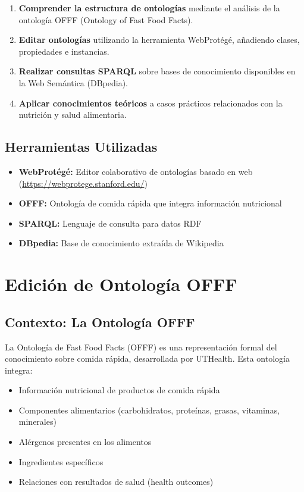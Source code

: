 \documentclass[12pt,a4paper]{article}
\begin{document}
\begin{enumerate}
    \item \textbf{Comprender la estructura de ontologías} mediante el análisis de la ontología OFFF (Ontology of Fast Food Facts).
    \item \textbf{Editar ontologías} utilizando la herramienta WebProtégé, añadiendo clases, propiedades e instancias.
    \item \textbf{Realizar consultas SPARQL} sobre bases de conocimiento disponibles en la Web Semántica (DBpedia).
    \item \textbf{Aplicar conocimientos teóricos} a casos prácticos relacionados con la nutrición y salud alimentaria.
\end{enumerate}

\subsection{Herramientas Utilizadas}

\begin{itemize}
    \item \textbf{WebProtégé:} Editor colaborativo de ontologías basado en web (\url{https://webprotege.stanford.edu/})
    \item \textbf{OFFF:} Ontología de comida rápida que integra información nutricional
    \item \textbf{SPARQL:} Lenguaje de consulta para datos RDF
    \item \textbf{DBpedia:} Base de conocimiento extraída de Wikipedia
\end{itemize}

\section{Edición de Ontología OFFF}

\subsection{Contexto: La Ontología OFFF}

La Ontología de Fast Food Facts (OFFF) es una representación formal del conocimiento sobre comida rápida, desarrollada por UTHealth. Esta ontología integra:

\begin{itemize}
    \item Información nutricional de productos de comida rápida
    \item Componentes alimentarios (carbohidratos, proteínas, grasas, vitaminas, minerales)
    \item Alérgenos presentes en los alimentos
    \item Ingredientes específicos
    \item Relaciones con resultados de salud (health outcomes)
\end{itemize}
\end{document}
